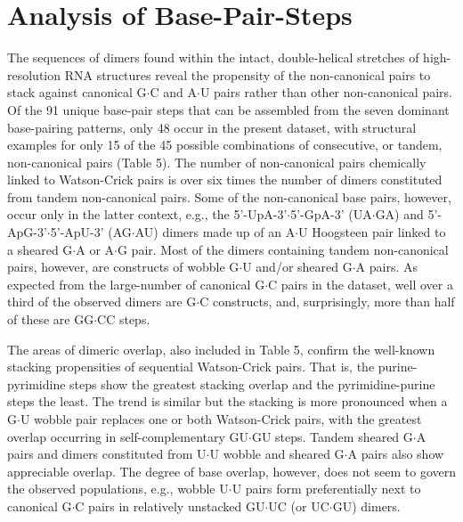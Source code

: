 \section{Analysis of Base-Pair-Steps}


The  sequences  of  dimers  found within  the  intact,  double-helical
stretches of  high-resolution RNA structures reveal  the propensity of
the  non-canonical  pairs to  stack  against  canonical G$\cdot$C  and
A$\cdot$U  pairs rather  than  other non-canonical  pairs.  Of the  91
unique base-pair steps  that can be assembled from  the seven dominant
base-pairing  patterns, only  48 occur  in the  present  dataset, with
structural examples  for only  15 of the  45 possible  combinations of
consecutive, or tandem, non-canonical pairs (Table 5). The number of
non-canonical pairs  chemically linked  to Watson-Crick pairs  is over
six times  the number of dimers constituted  from tandem non-canonical
pairs. Some of the non-canonical  base pairs, however, occur only in
the   latter  context,   e.g.,  the   5'-UpA-3'$\cdot$5'-GpA-3'
(UA$\cdot$GA)  and 5'-ApG-3'$\cdot$5'-ApU-3'  (AG$\cdot$AU) dimers
made up of  an A$\cdot$U Hoogsteen pair linked  to a sheared G$\cdot$A
or A$\cdot$G pair. Most  of the dimers containing tandem non-canonical
pairs,  however, are  constructs  of wobble  G$\cdot$U and/or  sheared
G$\cdot$A  pairs.  As  expected  from the  large-number  of  canonical
G$\cdot$C  pairs in the  dataset, well  over a  third of  the observed
dimers are  G$\cdot$C constructs, and, surprisingly,  more than half
of these are GG$\cdot$CC steps.

The areas  of dimeric overlap, also  included in Table  5, confirm the
well-known   stacking    propensities   of   sequential   Watson-Crick
pairs. That is, the purine-pyrimidine steps show the greatest stacking
overlap  and  the pyrimidine-purine  steps  the  least.  The trend  is
similar but  the stacking is  more pronounced when a  G$\cdot$U wobble
pair  replaces  one or  both  Watson-Crick  pairs,  with the  greatest
overlap  occurring  in  self-complementary GU$\cdot$GU  steps.  Tandem
sheared G$\cdot$A pairs and dimers constituted from U$\cdot$U wobble
and sheared G$\cdot$A pairs also show appreciable overlap.  The degree
of  base  overlap, however,  does  not  seem  to govern  the  observed
populations, e.g., wobble U$\cdot$U pairs form preferentially next to
canonical  G$\cdot$C  pairs in  relatively  unstacked GU$\cdot$UC  (or
UC$\cdot$GU) dimers.

